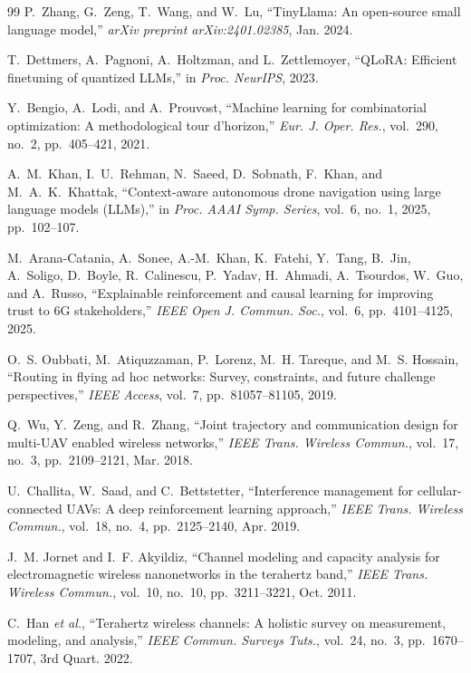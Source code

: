 \documentclass[journal]{IEEEtran}
\begin{document}
\begin{thebibliography}{99}
P.~Zhang, G.~Zeng, T.~Wang, and W.~Lu, ``TinyLlama: An open-source small language model,'' \textit{arXiv preprint arXiv:2401.02385}, Jan. 2024.

T.~Dettmers, A.~Pagnoni, A.~Holtzman, and L.~Zettlemoyer, ``QLoRA: Efficient finetuning of quantized LLMs,'' in \textit{Proc. NeurIPS}, 2023.

Y.~Bengio, A.~Lodi, and A.~Prouvost, ``Machine learning for combinatorial optimization: A methodological tour d'horizon,'' \textit{Eur. J. Oper. Res.}, vol.~290, no.~2, pp.~405--421, 2021.

A.~M.~Khan, I.~U.~Rehman, N.~Saeed, D.~Sobnath, F.~Khan, and M.~A.~K.~Khattak, ``Context-aware autonomous drone navigation using large language models (LLMs),'' in \textit{Proc. AAAI Symp. Series}, vol.~6, no.~1, 2025, pp.~102--107.

M.~Arana-Catania, A.~Sonee, A.-M.~Khan, K.~Fatehi, Y.~Tang, B.~Jin, A.~Soligo, D.~Boyle, R.~Calinescu, P.~Yadav, H.~Ahmadi, A.~Tsourdos, W.~Guo, and A.~Russo, ``Explainable reinforcement and causal learning for improving trust to 6G stakeholders,'' \textit{IEEE Open J. Commun. Soc.}, vol.~6, pp.~4101--4125, 2025.

O.~S. Oubbati, M.~Atiquzzaman, P.~Lorenz, M.~H. Tareque, and M.~S. Hossain, ``Routing in flying ad hoc networks: Survey, constraints, and future challenge perspectives,'' \textit{IEEE Access}, vol.~7, pp.~81057--81105, 2019.

Q.~Wu, Y.~Zeng, and R.~Zhang, ``Joint trajectory and communication design for multi-UAV enabled wireless networks,'' \textit{IEEE Trans. Wireless Commun.}, vol.~17, no.~3, pp.~2109--2121, Mar. 2018.

U.~Challita, W.~Saad, and C.~Bettstetter, ``Interference management for cellular-connected UAVs: A deep reinforcement learning approach,'' \textit{IEEE Trans. Wireless Commun.}, vol.~18, no.~4, pp.~2125--2140, Apr. 2019.

J.~M. Jornet and I.~F. Akyildiz, ``Channel modeling and capacity analysis for electromagnetic wireless nanonetworks in the terahertz band,'' \textit{IEEE Trans. Wireless Commun.}, vol.~10, no.~10, pp.~3211--3221, Oct. 2011.

C.~Han \textit{et al.}, ``Terahertz wireless channels: A holistic survey on measurement, modeling, and analysis,'' \textit{IEEE Commun. Surveys Tuts.}, vol.~24, no.~3, pp.~1670--1707, 3rd Quart. 2022.


\end{thebibliography}
\end{document}
